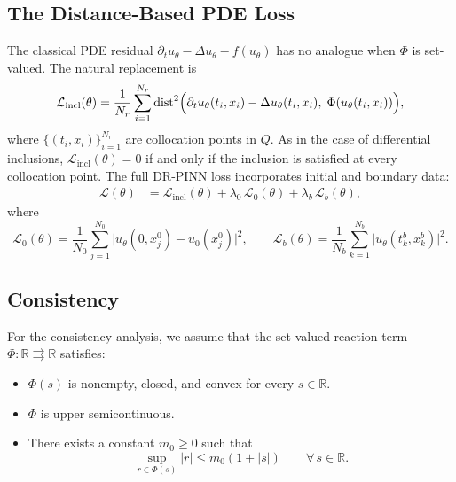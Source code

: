 \documentclass[11pt]{elsarticle}
\theoremstyle{definition}
\theoremstyle{remark}
\numberwithin{equation}{section}
\def\dist{\operatorname{dist}}
\begin{document}
	\subsection{The Distance-Based PDE Loss}
	\label{sec:pde-loss}
	
	The classical PDE residual $\partial_t u_\theta-\Delta u_\theta-f(u_\theta)$
	has no analogue when $\Phi$ is set-valued.  The natural replacement is
	\begin{equation}\label{eq:pde-distance-loss}
		\mathcal{L}_{\mathrm{incl}}(\theta)
		=
		\frac{1}{N_r}
		\sum_{i=1}^{N_r}
		\dist^2\Bigl(
		\partial_t u_\theta(t_i,x_i)-\Delta u_\theta(t_i,x_i),\;
		\Phi(u_\theta(t_i,x_i))
		\Bigr),
	\end{equation}
	where $\{(t_i,x_i)\}_{i=1}^{N_r}$ are collocation points in $Q$.  As in
	the case of differential inclusions, $\mathcal{L}_{\mathrm{incl}}(\theta)=0$ if and only if the
	inclusion is satisfied at every collocation point.  The full DR-PINN loss
	incorporates initial and boundary data:
	\begin{align*}
		\mathcal{L}(\theta)
		&=
		\mathcal{L}_{\mathrm{incl}}(\theta)
		+
		\lambda_0\,\mathcal{L}_0(\theta)
		+
		\lambda_b\,\mathcal{L}_b(\theta),
	\end{align*}
	where
	\[
	\mathcal{L}_0(\theta)
	=
	\frac{1}{N_0}\sum_{j=1}^{N_0}\bigl|u_\theta(0,x_j^0)-u_0(x_j^0)\bigr|^2,
	\qquad
	\mathcal{L}_b(\theta)
	=
	\frac{1}{N_b}\sum_{k=1}^{N_b}\bigl|u_\theta(t_k^b,x_k^b)\bigr|^2.
	\]
	
	\subsection{Consistency}
	\label{sec:pde-consistency}
	For the consistency analysis, we assume that the set-valued reaction term
	$\Phi:\mathbb{R}\rightrightarrows\mathbb{R}$ satisfies:
	
	\begin{itemize}
		\item[(P1)] $\Phi(s)$ is nonempty, closed, and convex for every
		$s\in\mathbb{R}$.
		
		\item[(P2)] $\Phi$ is upper semicontinuous.
		
		\item[(P3)] There exists a constant $m_0\geq 0$ such that
		\[
		\sup_{r\in\Phi(s)} |r|
		\leq m_0(1+|s|)
		\qquad\forall\,s\in\mathbb{R}.
		\]
	\end{itemize}

\end{document}
